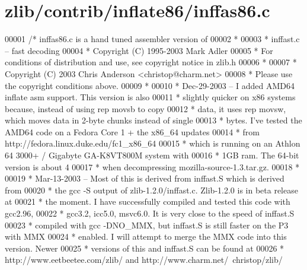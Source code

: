 \hypertarget{zlib_2contrib_2inflate86_2inffas86_8c_source}{}\section{zlib/contrib/inflate86/inffas86.c}
\label{zlib_2contrib_2inflate86_2inffas86_8c_source}

\begin{DoxyCode}
00001 \textcolor{comment}{/* inffas86.c is a hand tuned assembler version of}
00002 \textcolor{comment}{ *}
00003 \textcolor{comment}{ * inffast.c -- fast decoding}
00004 \textcolor{comment}{ * Copyright (C) 1995-2003 Mark Adler}
00005 \textcolor{comment}{ * For conditions of distribution and use, see copyright notice in zlib.h}
00006 \textcolor{comment}{ *}
00007 \textcolor{comment}{ * Copyright (C) 2003 Chris Anderson <christop@charm.net>}
00008 \textcolor{comment}{ * Please use the copyright conditions above.}
00009 \textcolor{comment}{ *}
00010 \textcolor{comment}{ * Dec-29-2003 -- I added AMD64 inflate asm support.  This version is also}
00011 \textcolor{comment}{ * slightly quicker on x86 systems because, instead of using rep movsb to copy}
00012 \textcolor{comment}{ * data, it uses rep movsw, which moves data in 2-byte chunks instead of single}
00013 \textcolor{comment}{ * bytes.  I've tested the AMD64 code on a Fedora Core 1 + the x86\_64 updates}
00014 \textcolor{comment}{ * from http://fedora.linux.duke.edu/fc1\_x86\_64}
00015 \textcolor{comment}{ * which is running on an Athlon 64 3000+ / Gigabyte GA-K8VT800M system with}
00016 \textcolor{comment}{ * 1GB ram.  The 64-bit version is about 4%
00017 \textcolor{comment}{ * when decompressing mozilla-source-1.3.tar.gz.}
00018 \textcolor{comment}{ *}
00019 \textcolor{comment}{ * Mar-13-2003 -- Most of this is derived from inffast.S which is derived from}
00020 \textcolor{comment}{ * the gcc -S output of zlib-1.2.0/inffast.c.  Zlib-1.2.0 is in beta release at}
00021 \textcolor{comment}{ * the moment.  I have successfully compiled and tested this code with gcc2.96,}
00022 \textcolor{comment}{ * gcc3.2, icc5.0, msvc6.0.  It is very close to the speed of inffast.S}
00023 \textcolor{comment}{ * compiled with gcc -DNO\_MMX, but inffast.S is still faster on the P3 with MMX}
00024 \textcolor{comment}{ * enabled.  I will attempt to merge the MMX code into this version.  Newer}
00025 \textcolor{comment}{ * versions of this and inffast.S can be found at}
00026 \textcolor{comment}{ * http://www.eetbeetee.com/zlib/ and http://www.charm.net/~christop/zlib/}
}
\end{DoxyCode}
